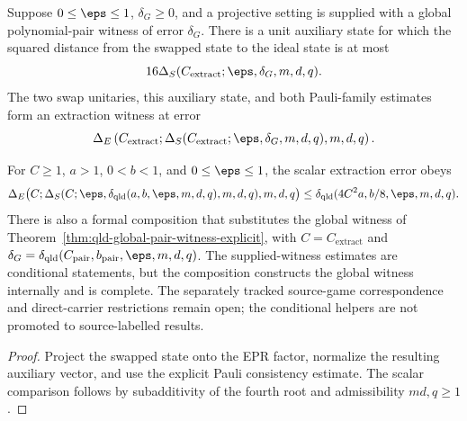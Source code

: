 \begin{theorem}
\label{thm:qld-extraction-witness-explicit}
\leanok
{}
Suppose $0\leq\eps\leq1$, $\delta_G\geq0$, and a projective setting is
supplied with a global polynomial-pair witness of error $\delta_G$.  There is
a unit auxiliary state for which the squared distance from the swapped state
to the ideal state is at most
\[
 16\Delta_S(C_{\mathrm{extract}};\eps,\delta_G,m,d,q).
\]
The two swap unitaries, this auxiliary state, and both Pauli-family estimates
form an extraction witness at error
\[
 \Delta_E\left(C_{\mathrm{extract}};
   \Delta_S(C_{\mathrm{extract}};\eps,\delta_G,m,d,q),m,d,q\right).
\]

For $C\geq1$, $a>1$, $0<b<1$, and $0\leq\eps\leq1$, the scalar extraction
error obeys
\[
 \Delta_E\bigl(C;\Delta_S(C;\eps,
   \delta_{\mathrm{qld}}(a,b,\eps,m,d,q),m,d,q),m,d,q\bigr)
 \leq\delta_{\mathrm{qld}}(4C^2a,b/8,\eps,m,d,q).
\]
There is also a formal composition that substitutes the global witness of
Theorem~\ref{thm:qld-global-pair-witness-explicit}, with
$C=C_{\mathrm{extract}}$ and
$\delta_G=\delta_{\mathrm{qld}}(C_{\mathrm{pair}},b_{\mathrm{pair}},
\eps,m,d,q)$.  The supplied-witness estimates are conditional statements, but
the composition constructs the global witness internally and is complete.
The separately tracked source-game correspondence and direct-carrier
restrictions remain open; the conditional helpers are not promoted to
source-labelled results.
\end{theorem}
\begin{proof}
Project the swapped state onto the EPR factor, normalize the resulting
auxiliary vector, and use the explicit Pauli consistency estimate.  The scalar
comparison follows by subadditivity of the fourth root and admissibility
$md,q\geq1$.
\end{proof}


